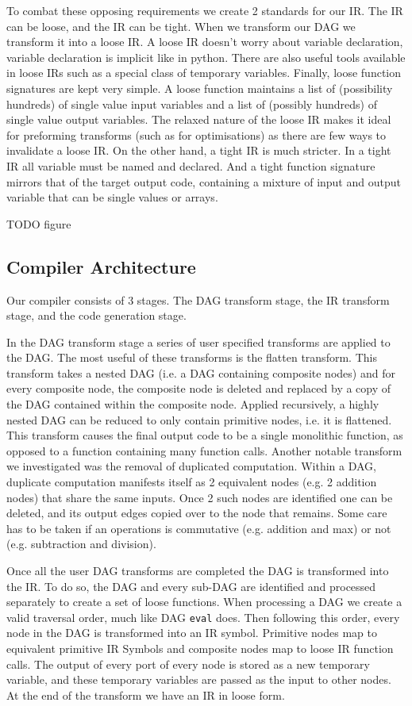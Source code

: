 To combat these opposing requirements we create 2 standards for our IR.
The IR can be loose, and the IR can be tight.
When we transform our DAG we transform it into a loose IR.
A loose IR doesn't worry about variable declaration, variable declaration is implicit like in python.
There are also useful tools available in loose IRs such as a special class of temporary variables.
Finally, loose function signatures are kept very simple.
A loose function maintains a list of (possibility hundreds) of single value input variables and a list of (possibly hundreds) of single value output variables.
The relaxed nature of the loose IR makes it ideal for preforming transforms (such as for optimisations) as there are few ways to invalidate a loose IR.
On the other hand, a tight IR is much stricter.
In a tight IR all variable must be named and declared.
And a tight function signature mirrors that of the target output code, containing a mixture of input and output variable that can be single values or arrays.

TODO figure

\subsection{Compiler Architecture}
Our compiler consists of 3 stages.
The DAG transform stage, the IR transform stage, and the code generation stage.

In the DAG transform stage a series of user specified transforms are applied to the DAG.
The most useful of these transforms is the flatten transform.
This transform takes a nested DAG (i.e. a DAG containing composite nodes) and for every composite node, the composite node is deleted and replaced by a copy of the DAG contained within the composite node.
Applied recursively, a highly nested DAG can be reduced to only contain primitive nodes, i.e. it is flattened.
This transform causes the final output code to be a single monolithic function, as opposed to a function containing many function calls.
Another notable transform we investigated was the removal of duplicated computation.
Within a DAG, duplicate computation manifests itself as 2 equivalent nodes (e.g. 2 addition nodes) that share the same inputs.
Once 2 such nodes are identified one can be deleted, and its output edges copied over to the node that remains.
Some care has to be taken if an operations is commutative (e.g. addition and max) or not (e.g. subtraction and division).

Once all the user DAG transforms are completed the DAG is transformed into the IR.
To do so, the DAG and every sub-DAG are identified and processed separately to create a set of loose functions.
When processing a DAG we create a valid traversal order, much like DAG \texttt{eval} does.
Then following this order, every node in the DAG is transformed into an IR symbol.
Primitive nodes map to equivalent primitive IR Symbols and composite nodes map to loose IR function calls.
The output of every port of every node is stored as a new temporary variable, and these temporary variables are passed as the input to other nodes.
At the end of the transform we have an IR in loose form.

